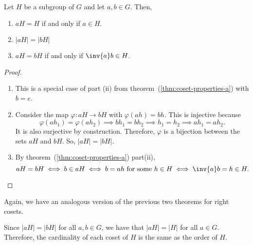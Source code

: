 \documentclass[11pt]{penrose}
\begin{document}
\begin{nthm}
    Let $H$ be a subgroup of $G$ and let $a, b \in G$. Then,
    \begin{enumerate}[label=(\roman*)]
        \item $aH = H$ if and only if $a \in H$.
        \item $|aH| = |bH|$
        \item $aH = bH$ if and only if $\inv{a} b \in H$.
    \end{enumerate}
\end{nthm}
\begin{proof}
    \begin{enumerate}[label=(\roman*)]
        \item This is a special case of part (ii) from theorem~(\ref{thm:coset-properties-a}) with $b = e$.

        \item Consider the map $\varphi : aH \to bH$ with $\varphi(ah) = bh$. This is injective because
        \begin{equation}
            \varphi(ah_1) = \varphi(ah_2)
            \implies bh_1 = bh_2
            \implies h_1 = h_2
            \implies ah_1 = ah_2.
        \end{equation}
        It is also surjective by construction. Therefore, $\varphi$ is a bijection between the sets $aH$ and $bH$. So, $|aH| = |bH|$.

        \item By theorem~(\ref{thm:coset-properties-a}) part(ii),
        \begin{equation*}
            aH = bH
            \iff b \in aH
            \iff b = ah \text{ for some } h \in H
            \iff \inv{a} b = h \in H.
            \qedhere
        \end{equation*}
    \end{enumerate}
\end{proof}

Again, we have an analogous version of the previous two theorems for right cosets.

\begin{remark}
    Since $|aH| = |bH|$ for all $a, b \in G$, we have that $|aH| = |H|$ for all $a \in G$. Therefore, the cardinality of each coset of $H$ is the same as the order of $H$.
\end{remark}
\end{document}
